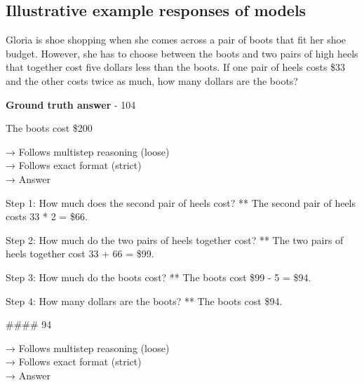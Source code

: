 \subsection{Illustrative example responses of models}


\label{response_analysis_examples}


\begin{tcolorbox}[breakable, title=Question]
Gloria is shoe shopping when she comes across a pair of boots that fit her shoe budget. However, she has to choose between the boots and two pairs of high heels that together cost five dollars less than the boots. If one pair of heels costs \$33 and the other costs twice as much, how many dollars are the boots?

\textbf{Ground truth answer} - 104
\end{tcolorbox}

\begin{tcolorbox}[breakable, title=Base Model]

The boots cost \$200

{\color{red}→ Follows multistep reasoning (loose)} \\
{\color{red}→ Follows exact format (strict)}\\
{\color{red}→ Answer} \\

    
\end{tcolorbox}


\begin{tcolorbox}[breakable, title=Base Model + SFT 1000 examples]

Step 1: How much does the second pair of heels cost? ** The second pair of heels costs 33 * 2 = \$66.

Step 2: How much do the two pairs of heels together cost? ** The two pairs of heels together cost 33 + 66 = \$99.

Step 3: How much do the boots cost? ** The boots cost \$99 - 5 = \$94.

Step 4: How many dollars are the boots? ** The boots cost \$94.

\#\#\#\# 94

{\color{teal}→ Follows multistep reasoning (loose)} \\
{\color{teal}→ Follows exact format (strict)}\\
{\color{red}→ Answer} \\
    
\end{tcolorbox}



